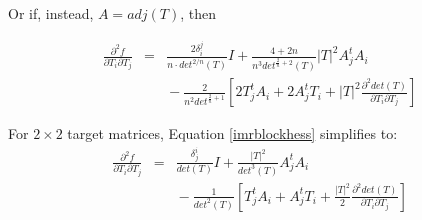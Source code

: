 \documentclass{report}
\begin{document}
\noindent Or if, instead, $A = adj(T)$, then

\begin{eqnarray} \label{imrblockhess}
\frac{\partial^2 f}{\partial T_i \partial T_j} 
&=& \frac{2 \delta_i^j}{n \cdot det^{2/n}(T)} I
+ \frac{4 + 2n}{n^3 det^{\frac{2}{n}+2}(T)} |T|^2 A_j^t A_i \\ \nonumber
& & {} - \frac{2}{n^2 det^{\frac{2}{n}+1}} \left[ 
2 T_j^t A_i + 2 A_j^t T_i + |T|^2 \frac{\partial^2 det(T)}{\partial T_i \partial T_j} \right]
\end{eqnarray}



\noindent For $2 \times 2$ target matrices, Equation \ref{imrblockhess} simplifies to:
\begin{eqnarray}
\frac{\partial^2 f}{\partial T_i \partial T_j}
&=& \frac{\delta^i_j}{det(T)}I + \frac{|T|^2}{det^3(T)} A_j^t A_i \\ \nonumber
& & {} - \frac{1}{det^2(T)} \left[ T_j^t A_i + A_j^t T_i 
+ \frac{|T|^2}{2} \frac{\partial^2 det(T)}{\partial T_i \partial T_j} \right]
\end{eqnarray}
\end{document}
